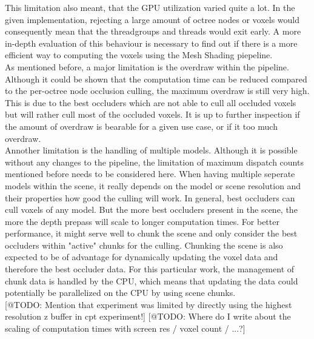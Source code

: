 \noindent
This limitation also meant, that the \ac{GPU} utilization varied quite a lot. In the given implementation, rejecting a 
large amount of octree nodes or voxels would consequently mean that the threadgroups and threads would exit early. A 
more in-depth evaluation of this behaviour is necessary to find out if there is a more efficient way to computing the 
voxels using the Mesh Shading piepeline. \\

\noindent
As mentioned before, a major limitation is the overdraw within the pipeline. Although it could be shown that the 
computation time can be reduced compared to the per-octree node occlusion culling, the maximum overdraw is still 
very high. This is due to the best occluders which are not able to cull all occluded voxels but will rather cull 
most of the occluded voxels. It is up to further inspection if the amount of overdraw is bearable for a given use 
case, or if it too much overdraw. \\

\noindent
Annother limitation is the handling of multiple models. Although it is possible without any changes to the pipeline, 
the limitation of maximum dispatch counts mentioned before needs to be considered here. When having multiple seperate 
models within the scene, it really depends on the model or scene resolution and their properties how good the culling 
will work. In general, best occluders can cull voxels of any model. But the more best occluders present in the scene, 
the more the depth prepass will scale to longer computation times. For better performance, it might serve well to 
chunk the scene and only consider the best occluders within "active" chunks for the culling. Chunking the scene is 
also expected to be of advantage for dynamically updating the voxel data and therefore the best occluder data. For 
this particular work, the management of chunk data is handled by the \ac{CPU}, which means that updating the data 
could potentially be parallelized on the \ac{CPU} by using scene chunks. \\



[@TODO: Mention that experiment was limited by directly using the highest resolution z buffer in cpt experiment!]
[@TODO: Where do I write about the scaling of computation times with screen res / voxel count / ...?]




%
%   

%  
%
%
